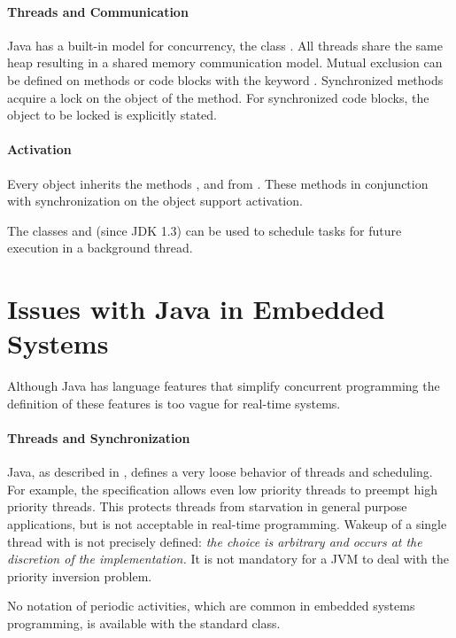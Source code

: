 \paragraph{Threads and Communication}

Java has a built-in model for concurrency, the class .
All threads share the same heap resulting in a shared memory
communication model. Mutual exclusion can be defined on methods or
code blocks with the keyword . Synchronized
methods acquire a lock on the object of the method. For synchronized
code blocks, the object to be locked is explicitly stated.


\paragraph{Activation}

Every object inherits the methods ,  and
 from . These methods in conjunction
with synchronization on the object support activation.


The classes  and
 (since JDK 1.3) can be used to schedule
tasks for future execution in a background thread.

\section{Issues with Java in Embedded Systems}

Although Java has language features that simplify concurrent
programming the definition of these features is too vague for
real-time systems.


\paragraph{Threads and Synchronization}

Java, as described in \cite{JavaLangSpec2}, defines a very loose
behavior of threads and scheduling. For example, the specification
allows even low priority threads to preempt high priority threads.
This protects threads from starvation in general purpose
applications, but is not acceptable in real-time programming. Wakeup
of a single thread with  is not precisely defined:
\textit{the choice is arbitrary and occurs at the discretion of the
implementation.} It is not mandatory for a JVM to deal with the
priority inversion problem.

No notation of periodic activities, which are common in embedded
systems programming, is available with the standard 
class.

